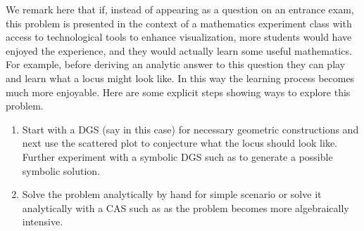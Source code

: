 \documentclass[12pt,a4paper]{article}%
\begin{document}
We remark here that if, instead of appearing as a question on an entrance
exam, this problem is presented in the context of a mathematics experiment
class with access to technological tools to enhance visualization, more
students would have enjoyed the experience, and they would actually learn
some useful mathematics. For example, before deriving an analytic answer
to this question they can play and learn what a locus might look like.
In this way the learning process becomes much more enjoyable.
Here are some explicit steps showing ways to explore this problem.

\begin{enumerate}
\item Start with a DGS (say \cite{CP} in this case) for necessary geometric
constructions and next use the scattered plot to conjecture what the locus
should look like. Further experiment with a symbolic DGS such as \cite{GE}
to generate a possible symbolic solution.

\item Solve the problem analytically by hand for simple scenario or solve it
analytically with a CAS such as \cite{Maple} as the problem becomes more
algebraically intensive.
\end{enumerate}
\end{document}
